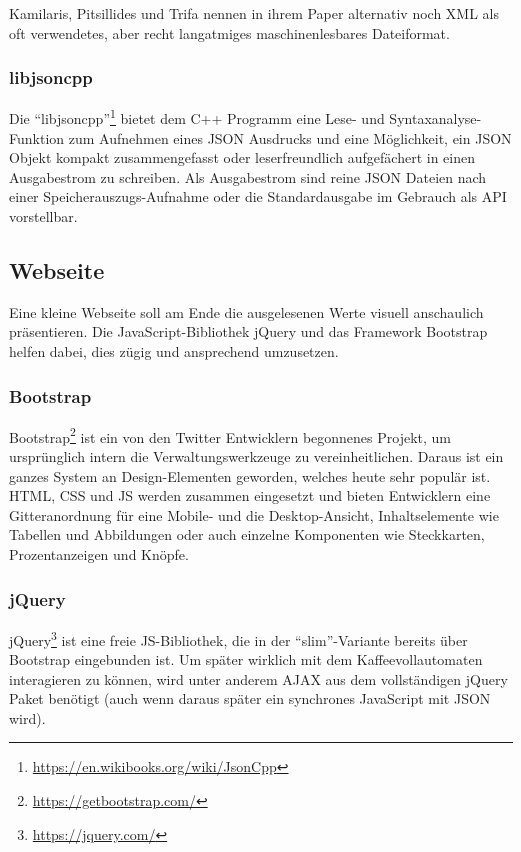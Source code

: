 Kamilaris, Pitsillides und Trifa nennen in ihrem Paper \cite{Kamilaris2011} alternativ noch \ac{XML} als oft verwendetes, aber recht langatmiges maschinenlesbares Dateiformat.

\subsubsection{libjsoncpp}
Die "`libjsoncpp"'\footnote{\url{https://en.wikibooks.org/wiki/JsonCpp}} bietet dem C++ Programm eine Lese- und Syntaxanalyse-Funktion zum Aufnehmen eines \ac{JSON} Ausdrucks und eine Möglichkeit, ein \ac{JSON} Objekt kompakt zusammengefasst oder leserfreundlich aufgefächert in einen Ausgabestrom zu schreiben.
Als Ausgabestrom sind reine \ac{JSON} Dateien nach einer Speicherauszugs-Aufnahme oder die Standardausgabe im Gebrauch als API vorstellbar.


\subsection{Webseite}
Eine kleine Webseite soll am Ende die ausgelesenen Werte visuell anschaulich präsentieren.
Die JavaScript-Bibliothek jQuery und das Framework Bootstrap helfen dabei, dies zügig und ansprechend umzusetzen.

\subsubsection{Bootstrap}
Bootstrap\footnote{\url{https://getbootstrap.com/}} ist ein von den Twitter Entwicklern begonnenes Projekt, um ursprünglich intern die Verwaltungswerkzeuge zu vereinheitlichen.
Daraus ist ein ganzes System an Design-Elementen geworden, welches heute sehr populär ist.
\ac{HTML}, \ac{CSS} und \ac{JS} werden zusammen eingesetzt und bieten Entwicklern eine Gitteranordnung für eine Mobile- und die Desktop-Ansicht, Inhaltselemente wie Tabellen und Abbildungen oder auch einzelne Komponenten wie Steckkarten, Prozentanzeigen und Knöpfe.

\subsubsection{jQuery}
jQuery\footnote{\url{https://jquery.com/}} ist eine freie \ac{JS}-Bibliothek, die in der "`slim"'-Variante bereits über Bootstrap eingebunden ist.
Um später wirklich mit dem Kaffeevollautomaten interagieren zu können, wird unter anderem \ac{AJAX} aus dem vollständigen jQuery Paket benötigt (auch wenn daraus später ein synchrones JavaScript mit \acs{JSON} wird).

